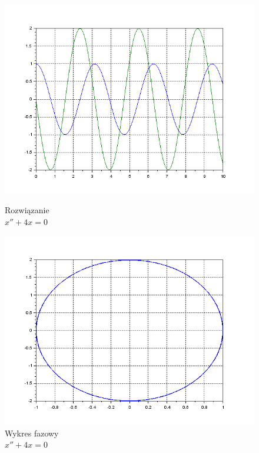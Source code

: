 \documentclass[12pt]{article}
\begin{document}
\begin{figure}[H]
  \centering
  \hspace{-1.6cm}
  \begin{minipage}[b]{0.49\textwidth}
    \includegraphics[scale=0.47]{./img/5-boporu-xy}
    \caption{Rozwiązanie \\ \centering$x''+4x=0$}
    \label{5-boporu-xy}
  \end{minipage}
  \hfill
  \begin{minipage}[b]{0.49\textwidth}
    \includegraphics[scale=0.47]{./img/5-boporu-phase}
    \caption{Wykres fazowy \\ \centering$x''+4x=0$}
    \label{5-boporu-phase}
  \end{minipage}
\end{figure}
\end{document}
